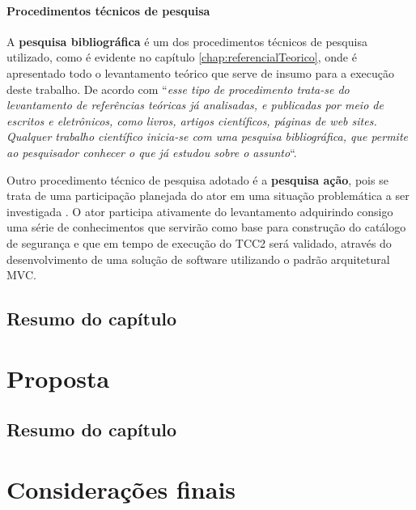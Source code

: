 \subsubsection{Procedimentos técnicos de pesquisa}

A \textbf{pesquisa bibliográfica} é um dos procedimentos técnicos de pesquisa utilizado, como é evidente no capítulo \ref{chap:referencialTeorico}, onde é apresentado todo o levantamento teórico que serve de insumo para a execução deste trabalho. De acordo com \cite[p.35]{fonseca2002metodologia} “\textit{esse tipo de procedimento trata-se do levantamento de referências teóricas já analisadas, e publicadas por meio de escritos e eletrônicos, como livros, artigos científicos, páginas de web sites. Qualquer trabalho científico inicia-se com uma pesquisa bibliográfica, que permite ao pesquisador conhecer o que já estudou sobre o assunto}“.
 
Outro procedimento técnico de pesquisa adotado é a \textbf{pesquisa ação}, pois se trata de uma participação planejada do ator em uma situação problemática a ser investigada \cite{fonseca2002metodologia}. O ator participa ativamente do levantamento adquirindo consigo uma série de conhecimentos que servirão como base para construção do catálogo de segurança e que em tempo de execução do TCC2 será validado, através do desenvolvimento de uma solução de software utilizando o padrão arquitetural MVC. 


\section{Resumo do capítulo}

\chapter{Proposta}
\label{chap:proposta}

\section{Resumo do capítulo}

\chapter{Considerações finais}